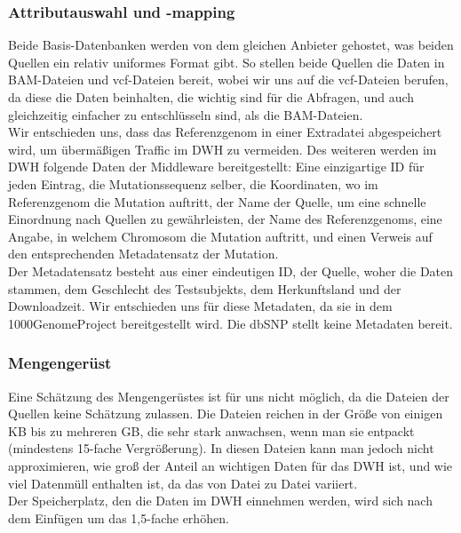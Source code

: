 \subsubsection{Attributauswahl und -mapping}
Beide Basis-Datenbanken werden von dem gleichen Anbieter gehostet, was beiden Quellen ein relativ uniformes Format gibt. So stellen beide Quellen die Daten in BAM-Dateien und vcf-Dateien bereit, wobei wir uns auf die vcf-Dateien berufen, da diese die Daten beinhalten, die wichtig sind für die Abfragen, und auch gleichzeitig einfacher zu entschlüsseln sind, als die BAM-Dateien.\\
Wir entschieden uns, dass das Referenzgenom in einer Extradatei abgespeichert wird, um übermäßigen Traffic im DWH zu vermeiden. Des weiteren werden im DWH folgende Daten der Middleware bereitgestellt: Eine einzigartige ID für jeden Eintrag, die Mutationssequenz selber, die Koordinaten, wo im Referenzgenom die Mutation auftritt, der Name der Quelle, um eine schnelle Einordnung nach Quellen zu gewährleisten, der Name des Referenzgenoms, eine Angabe, in welchem Chromosom die Mutation auftritt, und einen Verweis auf den entsprechenden Metadatensatz der Mutation.\\
Der Metadatensatz besteht aus einer eindeutigen ID, der Quelle, woher die Daten stammen, dem Geschlecht des Testsubjekts, dem Herkunftsland und der Downloadzeit. Wir entschieden uns für diese Metadaten, da sie in dem 1000GenomeProject bereitgestellt wird. Die dbSNP stellt keine Metadaten bereit. 
\subsubsection{Mengengerüst}
Eine Schätzung des Mengengerüstes ist für uns nicht möglich, da die Dateien der Quellen keine Schätzung zulassen. Die Dateien reichen in der Größe von einigen KB bis zu mehreren GB, die sehr stark anwachsen, wenn man sie entpackt (mindestens 15-fache Vergrößerung). In diesen Dateien kann man jedoch nicht approximieren, wie groß der Anteil an wichtigen Daten für das DWH ist, und wie viel Datenmüll enthalten ist, da das von Datei zu Datei variiert.\\
Der Speicherplatz, den die Daten im DWH einnehmen werden, wird sich nach dem Einfügen um das 1,5-fache erhöhen.\\
